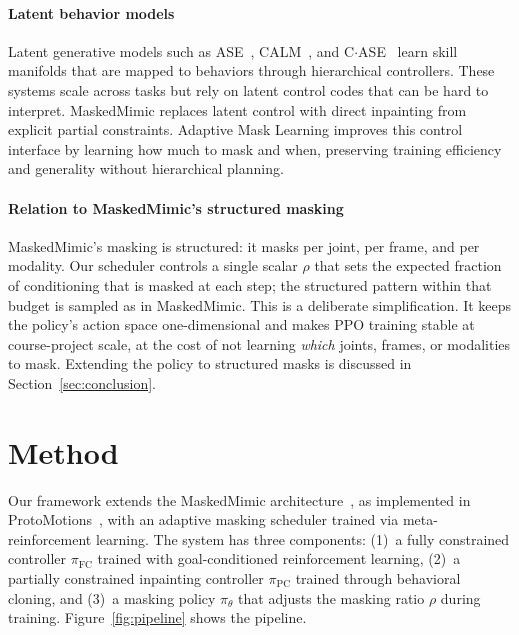\documentclass[10pt,letterpaper]{article}
\newcommand{\pfc}{\pi_{\mathrm{FC}}}
\newcommand{\ppc}{\pi_{\mathrm{PC}}}
\newcommand{\pth}{\pi_{\theta}}
\begin{document}
\paragraph{Latent behavior models}
Latent generative models such as ASE~\cite{peng2022ase}, CALM~\cite{tessler2023calm}, and C$\cdot$ASE~\cite{dou2023case} learn skill manifolds that are mapped to behaviors through hierarchical controllers. These systems scale across tasks but rely on latent control codes that can be hard to interpret. MaskedMimic replaces latent control with direct inpainting from explicit partial constraints. Adaptive Mask Learning improves this control interface by learning how much to mask and when, preserving training efficiency and generality without hierarchical planning.

\paragraph{Relation to MaskedMimic's structured masking}
MaskedMimic's masking is structured: it masks per joint, per frame, and per modality. Our scheduler controls a single scalar $\rho$ that sets the expected fraction of conditioning that is masked at each step; the structured pattern within that budget is sampled as in MaskedMimic. This is a deliberate simplification. It keeps the policy's action space one-dimensional and makes PPO training stable at course-project scale, at the cost of not learning \emph{which} joints, frames, or modalities to mask. Extending the policy to structured masks is discussed in Section~\ref{sec:conclusion}.

\section{Method}

Our framework extends the MaskedMimic architecture~\cite{tessler2024maskedmimic}, as implemented in ProtoMotions~\cite{protomotions}, with an adaptive masking scheduler trained via meta-reinforcement learning. The system has three components: (1)~a fully constrained controller $\pfc$ trained with goal-conditioned reinforcement learning, (2)~a partially constrained inpainting controller $\ppc$ trained through behavioral cloning, and (3)~a masking policy $\pth$ that adjusts the masking ratio $\rho$ during training. Figure~\ref{fig:pipeline} shows the pipeline.
\end{document}
